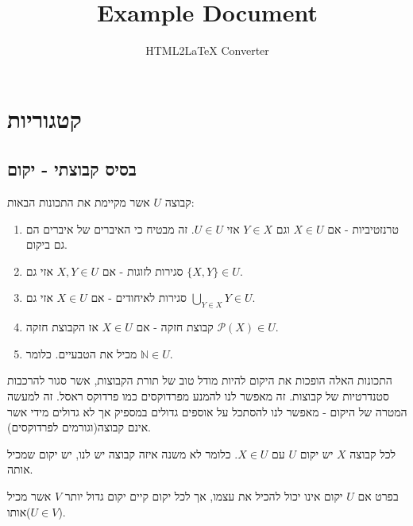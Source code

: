 \documentclass{tstextbook}
\begin{document}
\title{Example Document}
\author{HTML2LaTeX Converter}
\maketitle

\chapter{קטגוריות}

\section{בסיס קבוצתי - יקום}

\begin{definition}[יקום]
קבוצה \(U\) אשר מקיימת את התכונות הבאות:

  \begin{enumerate}
    \item טרנזטיביות - אם \(X \in U\) וגם \(Y \in X\) אזי \(U \in U\). זה מבטיח כי האיברים של איברים הם גם ביקום. 


    \item סגירות לזוגות - אם \(X,Y\in U\) אזי גם \(\{ X,Y \}\in U\). 


    \item סגירות לאיחודים - אם \(X \in U\) אזי גם \(\bigcup_{Y \in X}Y \in U\).  


    \item קבוצת חזקה - אם \(X \in U\) אז הקבוצת חזקה \(\mathcal{P}(X)\in U\). 


    \item מכיל את הטבעיים. כלומר \(\mathbb{N} \in U\). 


  \end{enumerate}
\end{definition}
\begin{remark}
התכונות האלה הופכות את היקום להיות מודל טוב של תורת הקבוצות, אשר סגור להרכבות סטנדרטיות של קבוצות. זה מאפשר לנו להמנע מפרדוקסים כמו פרדוקס ראסל. זה למעשה המטרה של היקום - מאפשר לנו להסתכל על אוספים גדולים במספיק אך לא גדולים מידי אשר אינם קבוצה(וגורמים לפרדוקסים).

\end{remark}
\begin{definition}
לכל קבוצה \(X\) יש יקום \(U\) עם \(X \in U\). כלומר לא משנה איזה קבוצה יש לנו, יש יקום שמכיל אותה.

\end{definition}
\begin{corollary}
בפרט אם \(U\) יקום אינו יכול להכיל את עצמו, אך לכל יקום קיים יקום גדול יותר \(V\) אשר מכיל אותו(\(U \in V\)).

\end{corollary}
\end{document}
